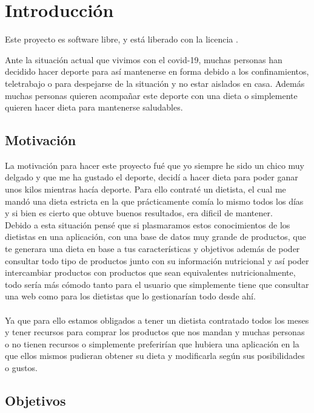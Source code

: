 \chapter{Introducción}

Este proyecto es software libre, y está liberado con la licencia \cite{gplv3}.

Ante la situación actual que vivimos con el covid-19, muchas personas han decidido hacer deporte 
para así mantenerse en forma debido a los confinamientos, teletrabajo o para despejarse de la 
situación y no estar aislados en casa. Además muchas personas quieren acompañar este deporte con una dieta o simplemente quieren hacer 
dieta para mantenerse saludables.

\section{Motivación}

La motivación para hacer este proyecto fué que yo siempre he sido un chico muy delgado y que 
me ha gustado el deporte, decidí a hacer dieta para poder ganar unos kilos mientras hacía deporte.
Para ello contraté un dietista, el cual me mandó una dieta estricta en la que prácticamente comía lo mismo 
todos los días y si bien es cierto que obtuve buenos resultados, era dificil de mantener. \\

Debido a esta situación pensé que si plasmaramos estos conocimientos de los dietistas en una aplicación, con una base de datos 
muy grande de productos, que te generara una dieta en base a tus características y objetivos 
además de poder consultar todo tipo de productos junto con su información nutricional y así poder 
intercambiar productos con productos que sean equivalentes nutricionalmente, todo sería más cómodo tanto para
el usuario que simplemente tiene que consultar una web como para los dietistas que lo gestionarían todo desde ahí.
\\\\
Ya que para ello estamos obligados a tener un dietista contratado todos los meses y tener recursos para 
comprar los productos que nos mandan y muchas personas o no tienen recursos o simplemente preferirían
que hubiera una aplicación en la que ellos mismos pudieran obtener su dieta y modificarla según sus 
posibilidades o gustos.

\section{Objetivos}

